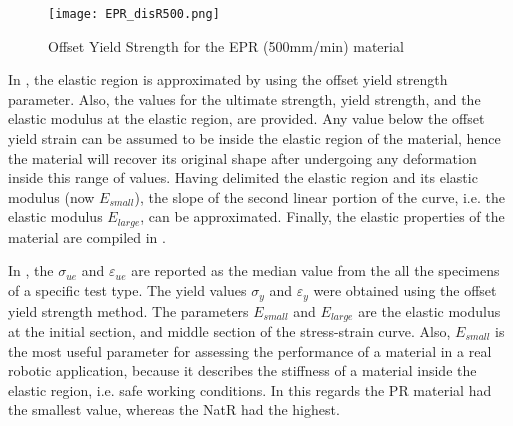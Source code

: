 \begin{figure}[H]
    \vspace*{-2em}
    \centering
    \texttt{[image: EPR\_disR500.png]}
    \caption{Offset Yield Strength for the EPR (500mm/min) material}
    \label{fig:EPR500off}
\end{figure}

In , the elastic region is approximated by using the offset yield strength parameter. Also, the values for the ultimate strength, yield strength, and the elastic modulus at the elastic region, are provided. Any value below the offset yield strain can be assumed to be inside the elastic region of the material, hence the material will recover its original shape after undergoing any deformation inside this range of values. Having delimited the elastic region and its elastic modulus (now $E_{small}$), the slope of the second linear portion of the curve, i.e. the elastic modulus $E_{large}$, can be approximated. Finally, the elastic properties of the material are compiled in .

In , the $\sigma_{ue}$ and $\varepsilon_{ue}$ are reported as the median value from the all the specimens of a specific test type. The yield values $\sigma_{y}$ and $\varepsilon_{y}$ were obtained using the offset yield strength method. The parameters $E_{small}$ and $E_{large}$ are the elastic modulus at the initial section, and middle section of the stress-strain curve. Also, $E_{small}$ is the most useful parameter for assessing the performance of a material in a real robotic application, because it describes the stiffness of a material inside the elastic region, i.e. safe working conditions. In this regards the PR material had the smallest value, whereas the NatR had the highest.


